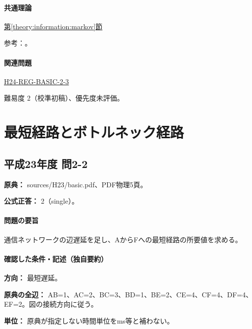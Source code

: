 \paragraph{共通理論} \hyperref[theory:information:markov]{第\ref*{theory:information:markov}節}

\par 参考：\cite{info_markov}。

\paragraph{関連問題} \hyperref[q:h24-reg-basic-2-3]{H24-REG-BASIC-2-3}

\par 難易度 2（校準初稿）、優先度未評価。

\section{最短経路とボトルネック経路}

\subsection{平成23年度 問2-2}
\label{q:h23-reg-basic-2-2}

\noindent\textbf{原典：} sources/H23/basic.pdf、PDF物理5頁。

\textbf{公式正答：} 2（single）。

\paragraph{問題の要旨} 通信ネットワークの辺遅延を足し、AからFへの最短経路の所要値を求める。

\paragraph{確認した条件・記述（独自要約）}\mbox{}\par

\noindent\textbf{方向：} 最短遅延。\par

\noindent\textbf{原典の全辺：} AB=\allowbreak{}1、AC=\allowbreak{}2、BC=\allowbreak{}3、BD=\allowbreak{}1、BE=\allowbreak{}2、CE=\allowbreak{}4、CF=\allowbreak{}4、DF=\allowbreak{}4、EF=\allowbreak{}2。図の接続方向に従う。\par

\noindent\textbf{単位：} 原典が指定しない時間単位をms等と補わない。\par


